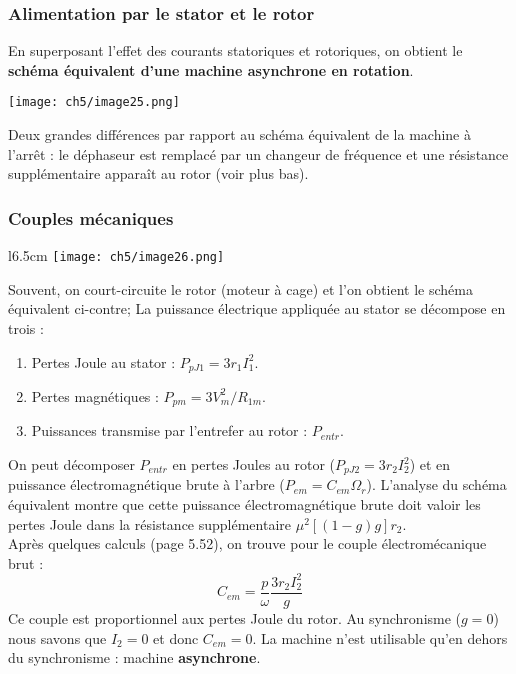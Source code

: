 		\subsubsection{Alimentation par le stator et le rotor}
		En superposant l'effet des courants statoriques et rotoriques, on obtient le 
		\textbf{schéma équivalent d'une machine asynchrone en rotation}.
		\begin{center}
		\texttt{[image: ch5/image25.png]}
		\end{center}
		Deux grandes différences par rapport au schéma équivalent de la machine à 
		l'arrêt : le déphaseur est remplacé par un changeur de fréquence et une 
		résistance supplémentaire apparaît au rotor (voir plus bas).
		
		\newpage
		\subsubsection{Couples mécaniques}
		\begin{wrapfigure}[8]{l}{6.5cm}
		\vspace{-8mm}
		\texttt{[image: ch5/image26.png]}
		\end{wrapfigure}
		Souvent, on court-circuite le rotor (moteur à cage) et l'on obtient le schéma 
		équivalent ci-contre; La puissance électrique appliquée au stator se décompose 
		en trois :
		\begin{enumerate}
		\item Pertes Joule au stator : $P_{pJ1} = 3r_1I_1^2$.
		\item Pertes magnétiques : $P_{pm} = 3V_m^2/R_{1m}$.
		\item Puissances transmise par l'entrefer au rotor : $P_{entr}$.
		\end{enumerate}
		On peut décomposer $P_{entr}$ en pertes Joules au rotor ($P_{pJ2} = 3r_2I_2^2$) 
		et en puissance électromagnétique brute à l'arbre ($P_{em} = C_{em}\Omega_r$). 
		L'analyse du schéma équivalent montre que cette puissance électromagnétique brute 
		doit valoir les pertes Joule dans la résistance supplémentaire $\mu^2[(1-g)g]r_2$.\\
		
		Après quelques calculs (page 5.52), on trouve pour le couple électromécanique brut :
		\begin{equation}
		C_{em} = \dfrac{p}{\omega}\dfrac{3r_2I_2^2}{g}
		\end{equation}
		Ce couple est proportionnel aux pertes Joule du rotor. Au synchronisme ($g=0$) 
		nous savons que $I_2=0$ et donc $C_{em}=0$. La machine n'est utilisable qu'en 
		dehors du synchronisme : machine \textbf{asynchrone}.



